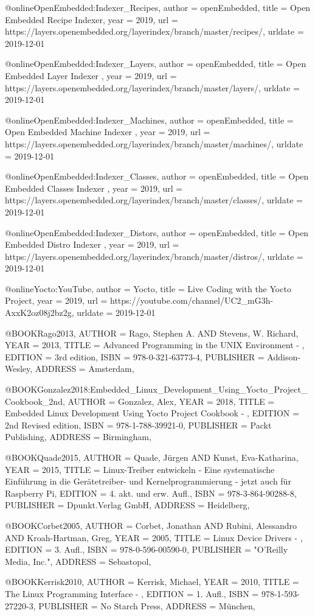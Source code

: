 @online{OpenEmbedded:Indexer_Recipes,
author = {openEmbedded},
title = {Open Embedded Recipe Indexer},
year = 2019,
url = {https://layers.openembedded.org/layerindex/branch/master/recipes/},
urldate = {2019-12-01}
}


@online{OpenEmbedded:Indexer_Layers,
author = {openEmbedded},
title = {Open Embedded Layer Indexer },
year = 2019,
url = {https://layers.openembedded.org/layerindex/branch/master/layers/},
urldate = {2019-12-01}
}


@online{OpenEmbedded:Indexer_Machines,
author = {openEmbedded},
title = {Open Embedded Machine Indexer },
year = 2019,
url = {https://layers.openembedded.org/layerindex/branch/master/machines/},
urldate = {2019-12-01}
}

@online{OpenEmbedded:Indexer_Classes,
author = {openEmbedded},
title = {Open Embedded Classes Indexer },
year = 2019,
url = {https://layers.openembedded.org/layerindex/branch/master/classes/},
urldate = {2019-12-01}
}

@online{OpenEmbedded:Indexer_Distors,
author = {openEmbedded},
title = {Open Embedded Distro Indexer },
year = 2019,
url = {https://layers.openembedded.org/layerindex/branch/master/distros/},
urldate = {2019-12-01}
}

@online{Yocto:YouTube,
author = {Yocto},
title = {Live Coding with the Yocto Project},
year = 2019,
url = {https://youtube.com/channel/UC2_mG3h-AxxK2oz08j2bz2g},
urldate = {2019-12-01}
}

@BOOK{Rago2013,
	AUTHOR = {Rago, Stephen A. AND Stevens, W. Richard},
	YEAR = {2013},
	TITLE = {Advanced Programming in the UNIX Environment - },
	EDITION = {3rd edition},
	ISBN = {978-0-321-63773-4},
	PUBLISHER = {Addison-Wesley},
	ADDRESS = {Amsterdam},
}


@BOOK{Gonzalez2018:Embedded_Linux_Development_Using_Yocto_Project_Cookbook_2nd,
	AUTHOR = {Gonzalez, Alex},
	YEAR = {2018},
	TITLE = {Embedded Linux Development Using Yocto Project Cookbook - },
	EDITION = {2nd Revised edition},
	ISBN = {978-1-788-39921-0},
	PUBLISHER = {Packt Publishing},
	ADDRESS = {Birmingham},
}

@BOOK{Quade2015,
	AUTHOR = {Quade, Jürgen AND Kunst, Eva-Katharina},
	YEAR = {2015},
	TITLE = {Linux-Treiber entwickeln - Eine systematische Einführung in die Gerätetreiber- und Kernelprogrammierung - jetzt auch für Raspberry Pi},
	EDITION = {4. akt. und erw. Aufl.},
	ISBN = {978-3-864-90288-8},
	PUBLISHER = {Dpunkt.Verlag GmbH},
	ADDRESS = {Heidelberg},
}

@BOOK{Corbet2005,
	AUTHOR = {Corbet, Jonathan AND Rubini, Alessandro AND Kroah-Hartman, Greg},
	YEAR = {2005},
	TITLE = {Linux Device Drivers - },
	EDITION = {3. Aufl.},
	ISBN = {978-0-596-00590-0},
	PUBLISHER = {"O'Reilly Media, Inc."},
	ADDRESS = {Sebastopol},
}

@BOOK{Kerrisk2010,
	AUTHOR = {Kerrisk, Michael},
	YEAR = {2010},
	TITLE = {The Linux Programming Interface - },
	EDITION = {1. Aufl.},
	ISBN = {978-1-593-27220-3},
	PUBLISHER = {No Starch Press},
	ADDRESS = {München},
}

